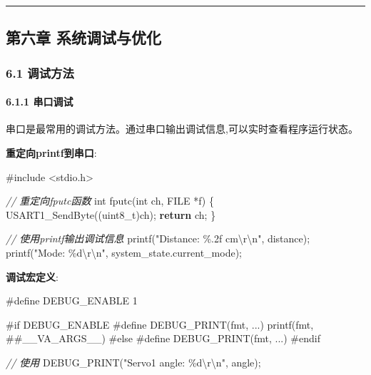 \documentclass[
]{article}
\newenvironment{Shaded}{}{}
\newcommand{\CommentTok}[1]{\textcolor[rgb]{0.38,0.63,0.69}{\textit{#1}}}
\newcommand{\ControlFlowTok}[1]{\textcolor[rgb]{0.00,0.44,0.13}{\textbf{#1}}}
\newcommand{\DataTypeTok}[1]{\textcolor[rgb]{0.56,0.13,0.00}{#1}}
\newcommand{\ImportTok}[1]{#1}
\newcommand{\NormalTok}[1]{#1}
\newcommand{\PreprocessorTok}[1]{\textcolor[rgb]{0.74,0.48,0.00}{#1}}
\newcommand{\SpecialCharTok}[1]{\textcolor[rgb]{0.25,0.44,0.63}{#1}}
\newcommand{\StringTok}[1]{\textcolor[rgb]{0.25,0.44,0.63}{#1}}
\begin{document}
\begin{center}\rule{0.5\linewidth}{0.5pt}\end{center}

\hypertarget{ux7b2cux516dux7ae0-ux7cfbux7edfux8c03ux8bd5ux4e0eux4f18ux5316}{%
\subsection{第六章
系统调试与优化}\label{ux7b2cux516dux7ae0-ux7cfbux7edfux8c03ux8bd5ux4e0eux4f18ux5316}}

\hypertarget{ux8c03ux8bd5ux65b9ux6cd5}{%
\subsubsection{6.1 调试方法}\label{ux8c03ux8bd5ux65b9ux6cd5}}

\hypertarget{ux4e32ux53e3ux8c03ux8bd5}{%
\paragraph{6.1.1 串口调试}\label{ux4e32ux53e3ux8c03ux8bd5}}

串口是最常用的调试方法。通过串口输出调试信息,可以实时查看程序运行状态。

\textbf{重定向printf到串口}:

\begin{Shaded}
\begin{Highlighting}[]
\PreprocessorTok{\#include }\ImportTok{\textless{}stdio.h\textgreater{}}

\CommentTok{// 重定向fputc函数}
\DataTypeTok{int}\NormalTok{ fputc(}\DataTypeTok{int}\NormalTok{ ch, }\DataTypeTok{FILE}\NormalTok{ *f)}
\NormalTok{\{}
\NormalTok{    USART1\_SendByte((}\DataTypeTok{uint8\_t}\NormalTok{)ch);}
    \ControlFlowTok{return}\NormalTok{ ch;}
\NormalTok{\}}

\CommentTok{// 使用printf输出调试信息}
\NormalTok{printf(}\StringTok{"Distance: \%.2f cm}\SpecialCharTok{\textbackslash{}r\textbackslash{}n}\StringTok{"}\NormalTok{, distance);}
\NormalTok{printf(}\StringTok{"Mode: \%d}\SpecialCharTok{\textbackslash{}r\textbackslash{}n}\StringTok{"}\NormalTok{, system\_state.current\_mode);}
\end{Highlighting}
\end{Shaded}

\textbf{调试宏定义}:

\begin{Shaded}
\begin{Highlighting}[]
\PreprocessorTok{\#define DEBUG\_ENABLE 1}

\PreprocessorTok{\#if DEBUG\_ENABLE}
    \PreprocessorTok{\#define DEBUG\_PRINT(fmt, ...) printf(fmt, \#\#\_\_VA\_ARGS\_\_)}
\PreprocessorTok{\#else}
    \PreprocessorTok{\#define DEBUG\_PRINT(fmt, ...)}
\PreprocessorTok{\#endif}

\CommentTok{// 使用}
\NormalTok{DEBUG\_PRINT(}\StringTok{"Servo1 angle: \%d}\SpecialCharTok{\textbackslash{}r\textbackslash{}n}\StringTok{"}\NormalTok{, angle);}
\end{Highlighting}
\end{Shaded}
\end{document}
